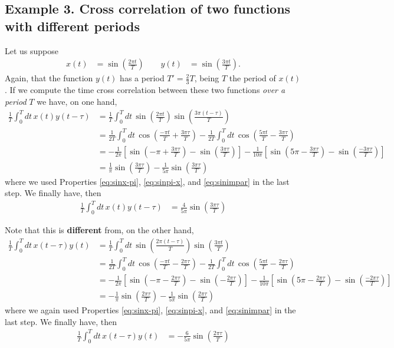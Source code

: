 \documentclass{article}
\begin{document}
\subsection*{Example 3. Cross correlation of two functions with different periods}
Let us suppose 
\begin{align}
  x(t) &= \sin\left( \frac{2\pi t}{T}\right)\,\quad & y(t) &= \sin\left( \frac{3\pi t}{T}\right).
\end{align}
Again, that the function $y(t)$ has a period $T'= \frac{2}{3}T$, being $T$ the period of $x(t)$. If we compute the time cross correlation between these two functions {\em over a period} $T$ we have, on one hand,
\begin{align}
  \frac{1}{T} \int_0^T dt\, x(t) y(t-\tau) &=
  \frac{1}{T} \int_0^T dt\, \sin\left( \frac{2\pi t}{T}\right) \sin\left( \frac{3\pi (t-\tau)}{T}\right) \\
  &= \frac{1}{2T} \int_0^T dt\, \cos \left( \frac{-\pi t}{T} + \frac{3\pi \tau}{T}\right)
  -  \frac{1}{2T} \int_0^T dt\, \cos \left( \frac{5\pi t}{T} - \frac{3\pi \tau}{T}\right) \\
  &= 
  -\frac{1}{2\pi} \left[
    \sin\left(-\pi + \frac{3\pi\tau}{T} \right)
    - \sin\left(\frac{3\pi\tau}{T} \right)
  \right]
  -\frac{1}{10\pi} \left[
    \sin\left(5\pi - \frac{3\pi\tau}{T} \right)
    - \sin\left(\frac{-3\pi\tau}{T} \right)
  \right] \\
  &= \frac{1}{\pi} 
    \sin\left(\frac{3\pi\tau}{T} \right)
  -\frac{1}{5\pi}
    \sin\left(\frac{3\pi\tau}{T} \right)
\end{align}
where we used Properties \ref{eq:sinx-pi}, \ref{eq:sinpi-x}, and \ref{eq:sinimpar} in the last step. We finally have, then
\begin{align}
  \frac{1}{T} \int_0^T dt\, x(t) y(t-\tau) &=
 \frac{4}{5\pi} 
    \sin\left(\frac{3\pi\tau}{T} \right)
\end{align}

Note that this is {\bf different} from, on the other hand, 
\begin{align}
  \frac{1}{T} \int_0^T dt\, x(t-\tau) y(t) &=
  \frac{1}{T} \int_0^T dt\, \sin\left( \frac{2\pi (t-\tau)}{T}\right) \sin\left( \frac{3\pi t}{T}\right) \\
  &= \frac{1}{2T} \int_0^T dt\, \cos \left( \frac{-\pi t}{T} - \frac{2\pi \tau}{T}\right)
  -  \frac{1}{2T} \int_0^T dt\, \cos \left( \frac{5\pi t}{T} - \frac{2\pi \tau}{T}\right) \\
  &= 
  -\frac{1}{2\pi} \left[
    \sin\left(-\pi - \frac{2\pi\tau}{T} \right)
    - \sin\left(-\frac{2\pi\tau}{T} \right)
  \right]
  -\frac{1}{10\pi} \left[
    \sin\left(5\pi - \frac{2\pi\tau}{T} \right)
    - \sin\left(\frac{-2\pi\tau}{T} \right)
  \right] \\
  &= -\frac{1}{\pi} 
    \sin\left(\frac{2\pi\tau}{T} \right)
  -\frac{1}{5\pi}
    \sin\left(\frac{2\pi\tau}{T} \right)
\end{align}
where we again used Properties \ref{eq:sinx-pi}, \ref{eq:sinpi-x}, and \ref{eq:sinimpar} in the last step. We finally have, then
\begin{align}
  \frac{1}{T} \int_0^T dt\, x(t-\tau) y(t) &=
 -\frac{6}{5\pi} 
    \sin\left(\frac{2\pi\tau}{T} \right)
\end{align}
\end{document}
